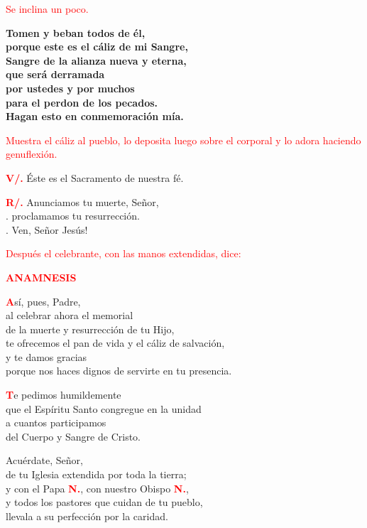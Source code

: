 \documentclass[12pt, letterpaper]{report}
\begin{document}
\large{\textcolor{red}{Se inclina un poco.}}

\noindent
\LARGE{\bfseries{Tomen y beban todos de \'el,\\
porque este es el c\'aliz de mi Sangre,\\
Sangre de la alianza nueva y eterna,\\
que ser\'a derramada\\
por ustedes y por muchos\\
para el perdon de los pecados.\\
Hagan esto en conmemoraci\'on m\'ia.}}

\large{\textcolor{red}{Muestra el c\'aliz al pueblo, lo deposita luego sobre el corporal y lo adora haciendo genuflexi\'on.}}

\noindent
\Large {\bfseries \textcolor{red}{V/.}} \hspace{0.5cm} \'Este es el Sacramento de nuestra f\'e.

\noindent
\Large {\bfseries \textcolor{red}{R/.}} \hspace{0.5cm} Anunciamos tu muerte, Se\~nor,\\
. \hspace{1.5cm} proclamamos tu resurrecci\'on.\\
. \hspace{1.5cm} Ven, Se\~nor Jes\'us!

\large{\textcolor{red}{Despu\'es el celebrante, con las manos extendidas, dice:}} 

\Large {\bfseries \textcolor{red}{ANAMNESIS}}

\lettrine[lines=1]{\bfseries \textcolor{red}{A}}{}\Large s\'i, pues, Padre,\\
al celebrar ahora el memorial\\
de la muerte y resurrecci\'on de tu Hijo,\\
te ofrecemos el pan de vida y el c\'aliz de salvaci\'on,\\
y te damos gracias\\
porque nos haces dignos de servirte en tu presencia.

\lettrine[lines=1]{\bfseries \textcolor{red}{T}}{}\Large e pedimos humildemente\\
que el Esp\'iritu Santo congregue en la unidad\\
a cuantos participamos\\
del Cuerpo y Sangre de Cristo.

\noindent
Acu\'erdate, Se\~nor,\\
de tu Iglesia extendida por toda la tierra; \\
y con el Papa {\bfseries \textcolor{red}{N.}}, con nuestro Obispo {\bfseries \textcolor{red}{N.}},\\
y todos los pastores que cuidan de tu pueblo,\\
llevala a su perfecci\'on por la caridad.
\end{document}
